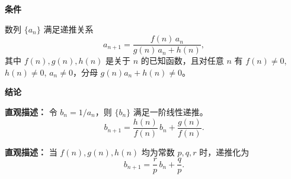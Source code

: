 \begin{statementbox}

	\textbf{\textcolor{CStatement}{条件}}
	\begin{description}[style=nextline, leftmargin=2.8em, labelsep=0.5em, itemsep=0.35em]
		\item[\textbf{\textcolor{CStatement}{条件1（分式线性递推）：}}] 数列 $\{a_n\}$ 满足递推关系
			\[
				a_{n+1} = \frac{f(n)\,a_n}{g(n)\,a_n + h(n)},
			\]
			其中 $f(n),g(n),h(n)$ 是关于 $n$ 的已知函数，且对任意 $n$ 有 $f(n)\neq 0$, $h(n)\neq 0$, $a_n\neq 0$，分母 $g(n)a_n+h(n)\neq 0$。
	\end{description}

	\textbf{\textcolor{CStatement}{结论}}
	\begin{description}[style=nextline, leftmargin=2.8em, labelsep=0.5em, itemsep=0.45em]
		\item[\textbf{\textcolor{CStatement}{结论一（倒数变换化线性）：}}]
			\textbf{\textcolor{CStatement}{直观描述：}}
			令 $b_n = 1/a_n$，则 $\{b_n\}$ 满足一阶线性递推。
			\[
				b_{n+1} = \frac{h(n)}{f(n)}\,b_n + \frac{g(n)}{f(n)}.
			\]

		\item[\textbf{\textcolor{CStatement}{常见变形（常系数特例）：}}]
			\textbf{\textcolor{CStatement}{直观描述：}}
			当 $f(n),g(n),h(n)$ 均为常数 $p,q,r$ 时，递推化为
			\[
				b_{n+1} = \frac{r}{p}\,b_n + \frac{q}{p}.
			\]
	\end{description}

\end{statementbox}

